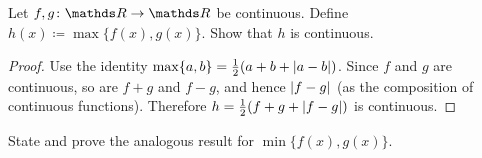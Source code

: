 \documentclass[12pt]{article}
\begin{document}
\begin{problem}
  Let \(f, g \colon \RR \to \RR\) be continuous.
  Define \(h(x) \coloneqq \max\{f(x), g(x)\}\).
  Show that \(h\) is continuous.
\end{problem}

\begin{proof}
  Use the identity \(\max\{a, b\} = \frac{1}{2}(a + b + \lvert a - b\rvert)\).
  Since \(f\) and \(g\) are continuous, so are \(f + g\) and \(f - g\), and hence
  \(\lvert f - g\rvert\) (as the composition of continuous functions).
  Therefore \(h = \frac{1}{2}(f + g + \lvert f - g\rvert)\) is continuous.
\end{proof}

\begin{exercise}
  State and prove the analogous result for \(\min\{f(x), g(x)\}\).
\end{exercise}

\end{document}
